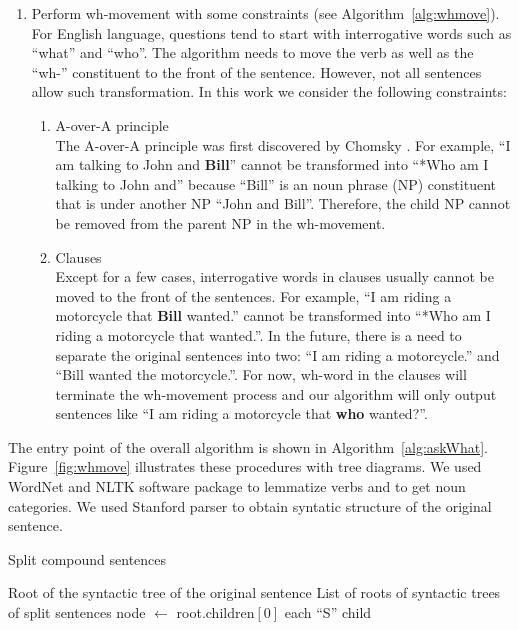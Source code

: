 \begin{enumerate}
\item Perform wh-movement with some constraints (see Algorithm~\ref{alg:whmove}). \\
For English language, questions tend to start with interrogative words such as ``what'' and ``who''. The algorithm needs to move the verb as well as the ``wh-'' constituent to the front of the sentence. However, not all sentences allow such transformation. In this work we consider the following constraints:
\begin{enumerate}
\item A-over-A principle\\
The A-over-A principle was first discovered by Chomsky \cite{chomsky73}. For example, ``I am talking to John and \textbf{Bill}'' cannot be transformed into ``*Who am I talking to John and'' because ``Bill'' is an noun phrase (NP) constituent that is under another NP ``John and Bill''. Therefore, the child NP cannot be removed from the parent NP in the wh-movement.
\item Clauses\\
Except for a few cases, interrogative words in clauses usually cannot be moved to the front of the sentences. For example, ``I am riding a motorcycle that \textbf{Bill} wanted.'' cannot be transformed into ``*Who am I riding a motorcycle that wanted.''. In the future, there is a need to separate the original sentences into two: ``I am riding a motorcycle.'' and ``Bill wanted the motorcycle.''. For now, wh-word in the clauses will terminate the wh-movement process and our algorithm will only output sentences like ``I am riding a motorcycle that \textbf{who} wanted?''.
\end{enumerate}
\end{enumerate}

The entry point of the overall algorithm is shown in Algorithm~\ref{alg:askWhat}. Figure~\ref{fig:whmove} illustrates these procedures with tree diagrams. We used WordNet \cite{wordnet} and NLTK software package \cite{nltk} to lemmatize verbs and to get noun categories. We used Stanford parser \cite{klein03} to obtain syntatic structure of the original sentence.
\begin{algorithm}
\caption{Split compound sentences}
\label{alg:splitcc}
\begin{algorithmic}[1]
\Require Root of the syntactic tree of the original sentence
\Ensure List of roots of syntactic trees of split sentences
\State node $\gets$ root.children$[0]$ 
        \State \Return each ``S'' child
    \EndIf
\EndIf
\EndProcedure
\end{algorithmic}
\end{algorithm}

